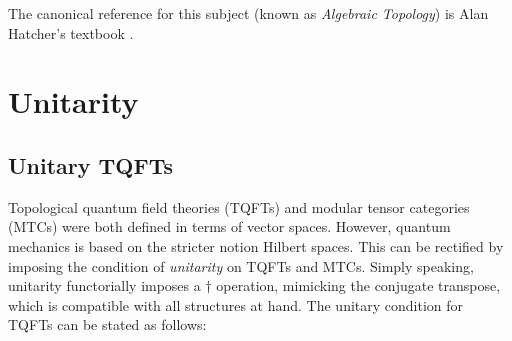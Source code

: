 \documentclass{article}
\theoremstyle{definition}
\numberwithin{figure}{section}
\begin{document}
The canonical reference for this subject (known as \textit{Algebraic Topology}) is Alan Hatcher's textbook \cite{hatcher2005algebraic}.

\section{Unitarity}
\label{Unitarity}

\subsection{Unitary TQFTs}

Topological quantum field theories (TQFTs) and modular tensor categories (MTCs) were both defined in terms of vector spaces. However, quantum mechanics is based on the stricter notion Hilbert spaces. This can be rectified by imposing the condition of \textit{unitarity} on TQFTs and MTCs. Simply speaking, unitarity functorially imposes a $\dagger$ operation, mimicking the conjugate transpose, which is compatible with all structures at hand. The unitary condition for TQFTs can be stated as follows:
\end{document}
